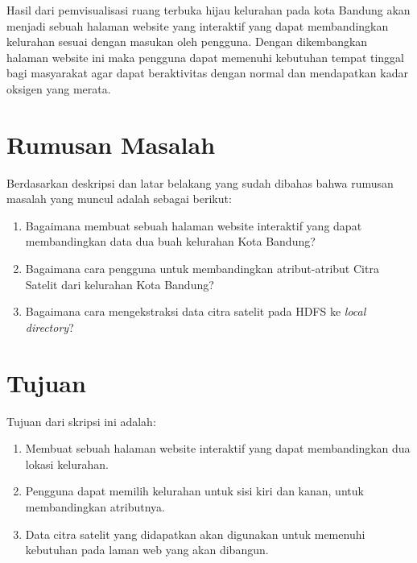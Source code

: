 \documentclass[a4paper,twoside]{article}
\begin{document}
Hasil dari pemvisualisasi ruang terbuka hijau kelurahan pada kota Bandung akan menjadi sebuah halaman website yang interaktif yang dapat membandingkan kelurahan sesuai dengan masukan oleh pengguna. Dengan dikembangkan halaman website ini maka pengguna dapat memenuhi kebutuhan tempat tinggal bagi masyarakat agar dapat beraktivitas dengan normal dan mendapatkan kadar oksigen yang merata. 


\section{Rumusan Masalah}
Berdasarkan deskripsi dan latar belakang yang sudah dibahas bahwa rumusan masalah yang muncul adalah sebagai berikut:

\begin{enumerate}
	\item Bagaimana membuat sebuah halaman website interaktif yang dapat membandingkan data dua buah kelurahan Kota Bandung?
	\item Bagaimana cara pengguna untuk membandingkan atribut-atribut Citra Satelit dari kelurahan Kota Bandung?
	\item Bagaimana cara mengekstraksi data citra satelit pada HDFS ke \textit{local directory}?	
\end{enumerate}

\section{Tujuan}
Tujuan dari skripsi ini adalah:
\begin{enumerate}
	\item Membuat sebuah halaman website interaktif yang dapat membandingkan dua lokasi kelurahan.
	\item Pengguna dapat memilih kelurahan untuk sisi kiri dan kanan, untuk membandingkan atributnya.
	\item Data citra satelit yang didapatkan akan digunakan untuk memenuhi kebutuhan pada laman web yang akan dibangun.
\end{enumerate}
\end{document}
